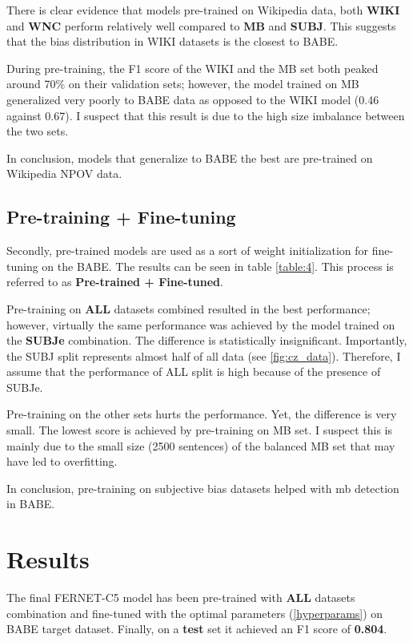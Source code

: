 There is clear evidence that models pre-trained on Wikipedia data, both \textbf{WIKI} and \textbf{WNC} perform relatively well compared to \textbf{MB} and \textbf{SUBJ}. This suggests that the bias distribution in WIKI datasets is the closest to BABE.

During pre-training, the F1 score of the WIKI and the MB set both peaked around 70\% on their validation sets; however, the model trained on MB generalized very poorly to BABE data as opposed to the WIKI model (0.46 against 0.67). I suspect that this result is due to the high size imbalance between the two sets.

In conclusion, models that generalize to BABE the best are pre-trained on Wikipedia NPOV data.

\subsection{Pre-training + Fine-tuning}
Secondly, pre-trained models are used as a sort of weight initialization for fine-tuning on the BABE. The results can be seen in table \ref{table:4}. This process is referred to as \textbf{Pre-trained + Fine-tuned}.

Pre-training on \textbf{ALL} datasets combined resulted in the best performance; however, virtually the same performance was achieved by the model trained on the \textbf{SUBJe} combination. The difference is statistically insignificant. Importantly, the SUBJ split represents almost half of all data (see \ref{fig:cz_data}). Therefore, I assume that the performance of ALL split is high because of the presence of SUBJe.

Pre-training on the other sets hurts the performance. Yet, the difference is very small. The lowest score is achieved by pre-training on MB set. I suspect this is mainly due to the small size (2500 sentences) of the balanced MB set that may have led to overfitting.

In conclusion, pre-training on subjective bias datasets helped with \gls{mb} detection in BABE.




\section{Results}
The final FERNET-C5 model has been pre-trained with \textbf{ALL} datasets combination and fine-tuned with the optimal parameters (\ref{hyperparams}) on BABE target dataset. Finally, on a \textbf{test} set it achieved an F1 score of \textbf{0.804}.

